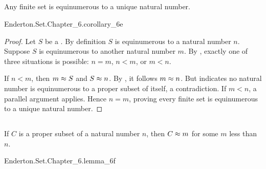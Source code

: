 \documentclass{report}
\begin{document}
\subsection{}%

  \begin{corollary}[6E]
    Any finite set is equinumerous to a unique natural number.
  \end{corollary}

    {Enderton.Set.Chapter\_6.corollary\_6e}

  \begin{proof}
    Let $S$ be a .
    By definition $S$ is equinumerous to a natural number $n$.
    Suppose $S$ is equinumerous to another natural number $m$.
    By , exactly one of three
      situations is possible: $n = m$, $n < m$, or $m < n$.

    If $n < m$, then $m \approx S$ and $S \approx n$.
    By , it follows $m \approx n$.
    But  indicates no natural number is
      equinumerous to a proper subset of itself, a contradiction.
    If $m < n$, a parallel argument applies.
    Hence $n = m$, proving every finite set is equinumerous to a unique natural
      number.
  \end{proof}

\subsection{}%

  \begin{lemma}[6F]
    If $C$ is a proper subset of a natural number $n$, then $C \approx m$ for
      some $m$ less than $n$.
  \end{lemma}

    {Enderton.Set.Chapter\_6.lemma\_6f}
\end{document}
